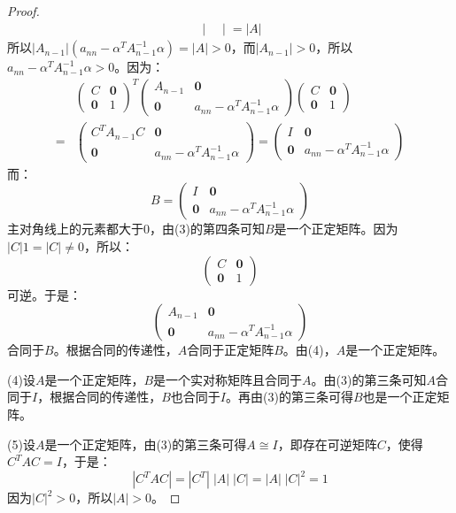 \begin{proof}
\begin{align*}
\begin{vmatrix}
		\end{vmatrix}
		=|A|
	\end{align*}
	所以$|A_{n-1}|(a_{nn}-\alpha^TA_{n-1}^{-1}\alpha)=|A|>0$，而$|A_{n-1}|>0$，所以$a_{nn}-\alpha^TA_{n-1}^{-1}\alpha>0$。因为：
	\begin{align*}
		&
		\begin{pmatrix}
			C & \mathbf{0} \\
			\mathbf{0} & 1
		\end{pmatrix}^T
		\begin{pmatrix}
			A_{n-1} & \mathbf{0} \\
			\mathbf{0} & a_{nn}-\alpha^TA_{n-1}^{-1}\alpha
		\end{pmatrix}
		\begin{pmatrix}
			C & \mathbf{0} \\
			\mathbf{0} & 1
		\end{pmatrix} \\
		=&
		\begin{pmatrix}
			C^TA_{n-1}C & \mathbf{0} \\
			\mathbf{0} & a_{nn}-\alpha^TA_{n-1}^{-1}\alpha
		\end{pmatrix}
		=
		\begin{pmatrix}
			I & \mathbf{0} \\
			\mathbf{0} & a_{nn}-\alpha^TA_{n-1}^{-1}\alpha
		\end{pmatrix}
	\end{align*}
	而：
	\begin{equation*}
		B=
		\begin{pmatrix}
			I & \mathbf{0} \\
			\mathbf{0} & a_{nn}-\alpha^TA_{n-1}^{-1}\alpha
		\end{pmatrix}
	\end{equation*}
	主对角线上的元素都大于$0$，由(3)的第四条可知$B$是一个正定矩阵。因为$|C|1=|C|\ne0$，所以：
	\begin{equation*}
		\begin{pmatrix}
			C & \mathbf{0} \\
			\mathbf{0} & 1
		\end{pmatrix}
	\end{equation*}
	可逆。于是：
	\begin{equation*}
		\begin{pmatrix}
			A_{n-1} & \mathbf{0} \\
			\mathbf{0} & a_{nn}-\alpha^TA_{n-1}^{-1}\alpha
		\end{pmatrix}
	\end{equation*}
	合同于$B$。根据合同的传递性，$A$合同于正定矩阵$B$。由(4)，$A$是一个正定矩阵。\par
	(4)设$A$是一个正定矩阵，$B$是一个实对称矩阵且合同于$A$。由(3)的第三条可知$A$合同于$I$，根据合同的传递性，$B$也合同于$I$。再由(3)的第三条可得$B$也是一个正定矩阵。\par
	(5)设$A$是一个正定矩阵，由(3)的第三条可得$A\cong I$，即存在可逆矩阵$C$，使得$C^TAC=I$，于是：
	\begin{equation*}
		|C^TAC|=|C^T|\;|A|\;|C|=|A|\;|C|^2=1
	\end{equation*}
	因为$|C|^2>0$，所以$|A|>0$。
\end{proof}

